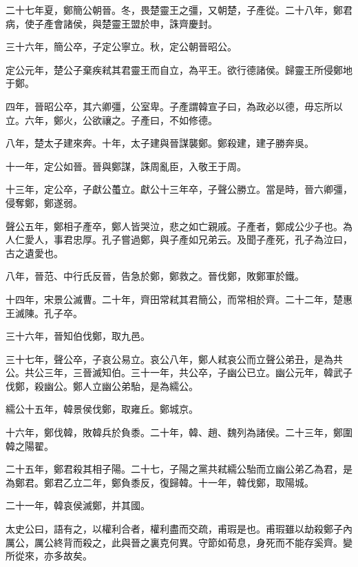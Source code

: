 二十七年夏，鄭簡公朝晉。冬，畏楚靈王之彊，又朝楚，子產從。二十八年，鄭君病，使子產會諸侯，與楚靈王盟於申，誅齊慶封。

三十六年，簡公卒，子定公寧立。秋，定公朝晉昭公。

定公元年，楚公子棄疾弒其君靈王而自立，為平王。欲行德諸侯。歸靈王所侵鄭地于鄭。

四年，晉昭公卒，其六卿彊，公室卑。子產謂韓宣子曰，為政必以德，毋忘所以立。六年，鄭火，公欲禳之。子產曰，不如修德。

八年，楚太子建來奔。十年，太子建與晉謀襲鄭。鄭殺建，建子勝奔吳。

十一年，定公如晉。晉與鄭謀，誅周亂臣，入敬王于周。

十三年，定公卒，子獻公蠆立。獻公十三年卒，子聲公勝立。當是時，晉六卿彊，侵奪鄭，鄭遂弱。

聲公五年，鄭相子產卒，鄭人皆哭泣，悲之如亡親戚。子產者，鄭成公少子也。為人仁愛人，事君忠厚。孔子嘗過鄭，與子產如兄弟云。及聞子產死，孔子為泣曰，古之遺愛也。

八年，晉范、中行氏反晉，告急於鄭，鄭救之。晉伐鄭，敗鄭軍於鐵。

十四年，宋景公滅曹。二十年，齊田常弒其君簡公，而常相於齊。二十二年，楚惠王滅陳。孔子卒。

三十六年，晉知伯伐鄭，取九邑。

三十七年，聲公卒，子哀公易立。哀公八年，鄭人弒哀公而立聲公弟丑，是為共公。共公三年，三晉滅知伯。三十一年，共公卒，子幽公已立。幽公元年，韓武子伐鄭，殺幽公。鄭人立幽公弟駘，是為繻公。

繻公十五年，韓景侯伐鄭，取雍丘。鄭城京。

十六年，鄭伐韓，敗韓兵於負黍。二十年，韓、趙、魏列為諸侯。二十三年，鄭圍韓之陽翟。

二十五年，鄭君殺其相子陽。二十七，子陽之黨共弒繻公駘而立幽公弟乙為君，是為鄭君。鄭君乙立二年，鄭負黍反，復歸韓。十一年，韓伐鄭，取陽城。

二十一年，韓哀侯滅鄭，并其國。

太史公曰，語有之，以權利合者，權利盡而交疏，甫瑕是也。甫瑕雖以劫殺鄭子內厲公，厲公終背而殺之，此與晉之裏克何異。守節如荀息，身死而不能存奚齊。變所從來，亦多故矣。